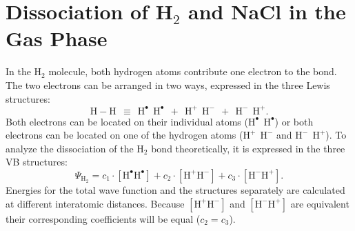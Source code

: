 \section{Dissociation of H$_2$ and NaCl in the Gas Phase}

In the H$_2$ molecule, both hydrogen atoms contribute one electron to the bond. The two electrons can be arranged in two ways, expressed in the three Lewis structures:
\begin{equation}
\nonumber
\mathrm{H-H\ \ \equiv \ \ H^{\bullet}\ \ H^{\bullet}\ \ +\ \ H^{+}\ \ H^{-}\ \ +\ \ H^{-}\ \ H^{+}}.
\end{equation}
Both electrons can be located on their individual atoms ($\mathrm{H^{\bullet}\ \ H^{\bullet}}$) or both electrons can be located on one of the hydrogen atoms ($\mathrm{H^{+}\ \ H^{-}}$ and $\mathrm{H^{-}\ \ H^{+}}$). To analyze the dissociation of the H$_2$ bond theoretically, it is expressed in the three VB structures:
\begin{equation}
\nonumber
\Psi_{\mathrm{H_2}} = c_1\cdot [\mathrm{H}^\bullet \mathrm{H}^\bullet] + c_2 \cdot [\mathrm{H}^{+}\mathrm{H}^{-}] + c_3 \cdot [\mathrm{H}^{-}\mathrm{H}^{+}]. 
\end{equation}
Energies for the total wave function and the structures separately are calculated at different interatomic distances. Because $[\mathrm{H}^{+}\mathrm{H}^{-}]$ and $[\mathrm{H}^{-}\mathrm{H}^{+}]$ are equivalent their corresponding coefficients will be equal ($c_2 = c_3$).  

